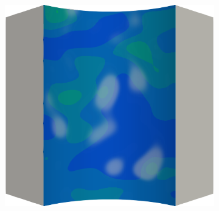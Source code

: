\begin{frame}
\begin{columns}[T]
\begin{column}{0.6\textwidth}
\begin{figure}
{\begin{subfigure}{0.19\textwidth}
          \end{subfigure}
          \hspace{0.06\textwidth}
          \begin{subfigure}{0.19\textwidth}
            \centering
            \includegraphics[width=\textwidth]{Chapter345/figures/ep.0006}
          \end{subfigure}
        }
        

\end{figure}
\end{column}
\end{columns}
\end{frame}
